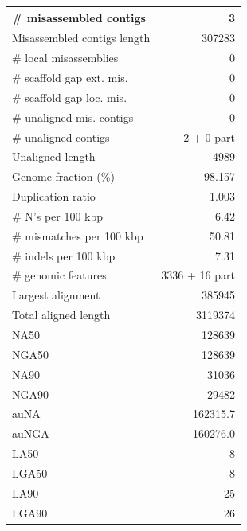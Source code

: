 \documentclass[12pt,a4paper]{article}
\begin{document}
\begin{table}[ht]
\begin{center}
\begin{tabular}{|l*{1}{|r}|}
\# misassembled contigs & 3 \\ \hline
Misassembled contigs length & 307283 \\ \hline
\# local misassemblies & 0 \\ \hline
\# scaffold gap ext. mis. & 0 \\ \hline
\# scaffold gap loc. mis. & 0 \\ \hline
\# unaligned mis. contigs & 0 \\ \hline
\# unaligned contigs & 2 + 0 part \\ \hline
Unaligned length & 4989 \\ \hline
Genome fraction (\%) & 98.157 \\ \hline
Duplication ratio & 1.003 \\ \hline
\# N's per 100 kbp & 6.42 \\ \hline
\# mismatches per 100 kbp & 50.81 \\ \hline
\# indels per 100 kbp & 7.31 \\ \hline
\# genomic features & 3336 + 16 part \\ \hline
Largest alignment & 385945 \\ \hline
Total aligned length & 3119374 \\ \hline
NA50 & 128639 \\ \hline
NGA50 & 128639 \\ \hline
NA90 & 31036 \\ \hline
NGA90 & 29482 \\ \hline
auNA & 162315.7 \\ \hline
auNGA & 160276.0 \\ \hline
LA50 & 8 \\ \hline
LGA50 & 8 \\ \hline
LA90 & 25 \\ \hline
LGA90 & 26 \\ \hline
\end{tabular}
\end{center}
\end{table}
\end{document}
